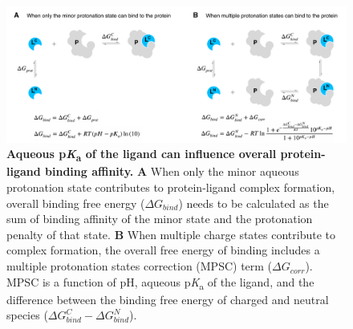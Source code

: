 \documentclass[9pt,lineno,final]{elife}
\newcommand{\pKa}{p\textit{K}\textsubscript{a}}
\begin{document}
\begin{figure}[h]
\centering
\includegraphics[width=1.0\linewidth]{figures/pKa-effects-on-protein-ligand-binding.pdf}
\caption{ {\bf Aqueous \pKa{} of the ligand can influence overall protein-ligand binding affinity.} {\bf A} When only the minor aqueous protonation state contributes to protein-ligand complex formation, overall binding free energy ($\Delta G_{bind}$) needs to be calculated as the sum of binding affinity of the minor state and the protonation penalty of that state. {\bf B} When multiple charge states contribute to complex formation, the overall free energy of binding includes a multiple protonation states correction (MPSC) term ($\Delta G_{corr}$). MPSC is a function of pH, aqueous \pKa{} of the ligand, and the difference between the binding free energy of charged and neutral species ($\Delta G_{bind}^{C} - \Delta G_{bind}^{N}$).
}
\label{fig:pKa-effects-on-protein-ligand-binding}
\end{figure}
\end{document}
